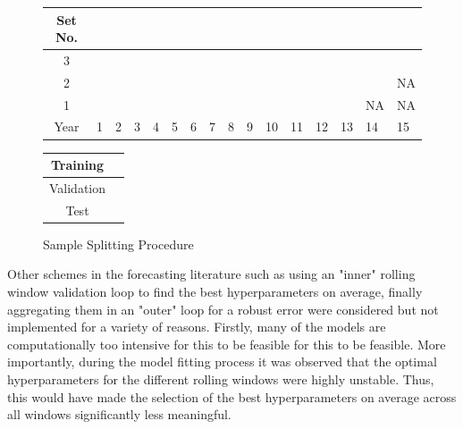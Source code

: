 \documentclass[a4paper, table]{article}
\begin{document}
\begin{figure}
	\begin{center}
		\begin{tabular}{|c|p{0.40cm}p{0.40cm}p{0.40cm}p{0.40cm}p{0.40cm}p{0.40cm}p{0.40cm}p{0.40cm}p{0.40cm}p{0.40cm}p{0.40cm}p{0.40cm}p{0.40cm}p{0.40cm}p{0.40cm}|}
			\hline
			Set No. &&&&&&&&&&&&&&& \\
			\hline
			3 & \cellcolor{cyan} & \cellcolor{cyan} & \cellcolor{cyan} & \cellcolor{cyan} & \cellcolor{cyan} & \cellcolor{cyan} & \cellcolor{cyan} & \cellcolor{cyan} & \cellcolor{cyan} &
			\cellcolor{pink} & \cellcolor{pink} & \cellcolor{pink} & \cellcolor{pink} & \cellcolor{pink} & 	
			\cellcolor{olive} \\
			2 & \cellcolor{cyan} & \cellcolor{cyan} & \cellcolor{cyan} & \cellcolor{cyan} & \cellcolor{cyan} & \cellcolor{cyan} & \cellcolor{cyan} & \cellcolor{cyan} &
			\cellcolor{pink} & \cellcolor{pink} & \cellcolor{pink} & \cellcolor{pink} & \cellcolor{pink} & 	
			\cellcolor{olive} & NA  \\
			1 & \cellcolor{cyan} & \cellcolor{cyan} & \cellcolor{cyan} & \cellcolor{cyan} & \cellcolor{cyan} & \cellcolor{cyan} & \cellcolor{cyan} &
			\cellcolor{pink} & \cellcolor{pink} & \cellcolor{pink} & \cellcolor{pink} & \cellcolor{pink} & 	
			\cellcolor{olive} & NA & NA \\
			\hline
			Year & 1 & 2 & 3 & 4 & 5 & 6 & 7 & 8 & 9 & 10 & 11 & 12 & 13 & 14 & 15\\
			\hline
		\end{tabular}
		\medskip
		\begin{tabular}{|c|p{0.40cm}|}
			\hline
			Training & \cellcolor{cyan} \\
			\hline
			Validation & \cellcolor{pink} \\
			\hline
			Test & \cellcolor{olive} \\
			\hline
		\end{tabular}
	\end{center}
	\caption{Sample Splitting Procedure}
	\label{sample_split_diag}
\end{figure}

Other schemes in the forecasting literature such as using an "inner" rolling window validation loop to find the best hyperparameters on average, finally aggregating them in an "outer" loop for a robust error were considered but not implemented for a variety of reasons. Firstly, many of the models are computationally too intensive for this to be feasible for this to be feasible. More importantly, during the model fitting process it was observed that the optimal hyperparameters for the different rolling windows were highly unstable. Thus, this would have made the selection of the best hyperparameters on average across all windows significantly less meaningful.
\end{document}
